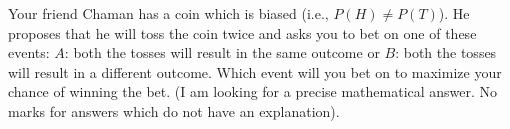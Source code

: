\documentclass[solution,addpoints,12pt]{exam}
\begin{document}
\begin{questions}


\question[1] Your friend Chaman has a coin which is biased (i.e., $P(H) \neq P(T)$). He proposes that he will toss the coin twice and asks you to bet on one of these events: $A$: both the tosses will result in the same outcome or $B$: both the tosses will result in a different outcome. Which event will you bet on to maximize your chance of winning the bet. (I am looking for a precise mathematical answer. No marks for answers which do not have an explanation). 
\begin{solution} 
\end{solution}


\end{questions}
\end{document}

